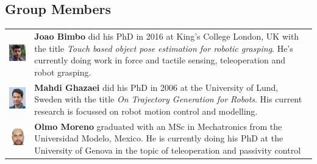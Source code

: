 \documentclass[]{article}
\begin{document}
\subsection{Group Members}
\begin{tabular}{m{3cm} m{10cm}}
	\includegraphics[width=1.0in]{joao.jpeg} & 
	\textbf{Joao Bimbo} did his PhD in 2016 at King's College London, UK with the title \emph{Touch based object pose estimation for robotic grasping}. He's currently doing work in force and tactile sensing, teleoperation and robot grasping.\\
	\includegraphics[width=1.0in]{mahdi_pass.jpg} &
	\textbf{Mahdi Ghazaei} did his PhD in 2006 at the University of Lund, Sweden with the title \emph{On Trajectory Generation for Robots}.
	His current research is focussed on robot motion control and modelling.\\
	\includegraphics[width=1.0in]{olmo.jpg} &
	\textbf{Olmo Moreno} graduated with an MSc in Mechatronics from the Universidad Modelo, Mexico. He is currently doing his PhD at the University of Genova in the topic of teleoperation and passivity control\\		
\end{tabular}
\end{document}
